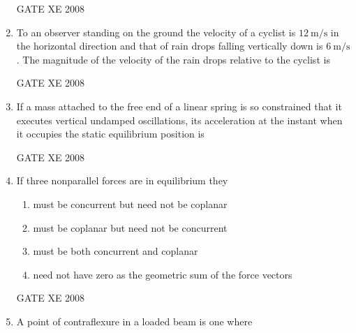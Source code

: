 \documentclass[12pt]{article}
\begin{document}
\begin{enumerate}
GATE XE 2008

\item To an observer standing on the ground the velocity of a cyclist is $12 \ \text{m/s}$ in the horizontal direction and that of rain drops falling vertically down is $6 \ \text{m/s}$. The magnitude of the velocity of the rain drops relative to the cyclist is  

\begin{enumerate}
\end{enumerate}

GATE XE 2008

\item If a mass attached to the free end of a linear spring is so constrained that it executes vertical undamped oscillations, its acceleration at the instant when it occupies the static equilibrium position is  

\begin{enumerate}
\end{enumerate}

GATE XE 2008

\item If three nonparallel forces are in equilibrium they  

\begin{enumerate}
\item  must be concurrent but need not be coplanar  
\item  must be coplanar but need not be concurrent  
\item  must be both concurrent and coplanar  
\item  need not have zero as the geometric sum of the force vectors  
\end{enumerate}

GATE XE 2008

\item A point of contraflexure in a loaded beam is one where 


\end{enumerate}
\end{document}
